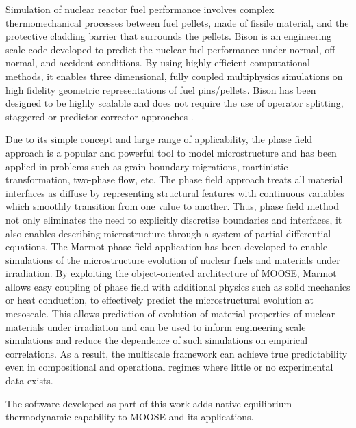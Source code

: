 	Simulation of nuclear reactor fuel performance involves complex thermomechanical processes between fuel pellets, made of fissile material, and the protective cladding barrier that surrounds the pellets. {Bison} is an engineering scale code developed to predict the nuclear fuel performance under normal, off-normal, and accident conditions. By using highly efficient computational methods, it enables three dimensional, fully coupled multiphysics simulations on high fidelity geometric representations of fuel pins/pellets. {Bison} has been designed to be highly scalable and does not require the use of operator splitting, staggered or predictor-corrector approaches \cite{WILLIAMSON2012149}.

	Due to its simple concept and large range of applicability, the phase field approach is a popular and powerful tool to model microstructure and has been applied in problems such as grain boundary migrations, martinistic transformation, two-phase flow, etc. The phase field approach treats all material interfaces as diffuse by representing structural features with continuous variables which smoothly transition from one value to another. Thus, phase field method not only eliminates the need to explicitly discretise boundaries and interfaces, it also enables describing microstructure through a system of partial differential equations.  The {Marmot} phase field application has been developed to enable simulations of the microstructure evolution of nuclear fuels and materials under irradiation. By exploiting the object-oriented architecture of {MOOSE}, {Marmot} allows easy coupling of phase field with additional physics such as solid mechanics or heat conduction, to effectively predict the microstructural evolution at mesoscale. This allows prediction of evolution of material properties of nuclear materials under irradiation and can be used to inform engineering scale simulations and reduce the dependence of such simulations on empirical correlations. As a result, the multiscale framework can achieve true predictability even in compositional and operational regimes where little or no experimental data exists.

	The software developed as part of this work adds native  equilibrium thermodynamic capability to MOOSE and its applications.

